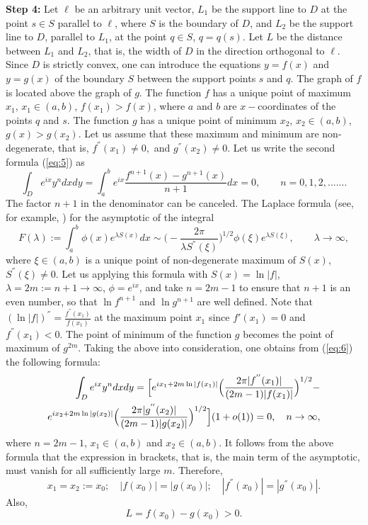 \documentclass[final,11pt]{article}
\begin{document}
{\bf Step 4:} Let $\ell$ be an arbitrary unit vector, $L_1$ be the support line to $D$ at the point $s\in S$
parallel to $\ell$, where $S$ is the boundary of $D$,
and $L_2$ be  the support line to $D$,  parallel to $L_1$, at the point $q\in S$, $q=q(s)$.
Let $L$ be the distance between $L_1$ and $L_2$, that is, the width
of $D$ in the direction orthogonal to $\ell$.
 Since $D$ is strictly convex, one can introduce the equations $y=f(x)$ and  $y=g(x)$
of the boundary $S$ between the support points $s$ and $q$. The graph of $f$ is located above
the graph of $g$. The function $f$ has a unique point of maximum $x_1$, $x_1\in (a,b)$, $f(x_1)>f(x)$,
where $a$ and $b$ are $x-$coordinates of the points  $q$ and $s$.
  The function $g$ has a unique point of  minimum $x_2$,  $x_2\in (a,b)$, $g(x)>g(x_2)$.
  Let us assume that these maximum and minimum are
non-degenerate, that is, $f^{''}(x_1)\neq 0,$ and $g^{''}(x_2)\neq 0.$
Let us write the second  formula (\ref{eq:5}) as
 \begin{equation}\label{eq:6}
\int_D e^{ix}y^ndxdy=\int_a^b e^{ix} \frac {f^{n+1}(x)-g^{n+1}(x)}{n+1} dx= 0, \qquad n=0,1,2,.......
\end{equation}
The factor $n+1$ in the denominator can be canceled. 
The Laplace formula (see, for example, \cite{F}) for the asymptotic of the integral
$$ F(\lambda):=\int_a^b \phi(x) e^{\lambda S(x)}dx\sim \Big(-\frac{2\pi}{\lambda S^{''}(\xi)}\Big)^{1/2} \phi(\xi)e^{\lambda S(\xi)},\qquad \lambda\to \infty,$$
where $\xi\in (a,b)$  is a unique point of non-degenerate maximum of $S(x)$,  $S^{''}(\xi)\neq 0$.
Let us applying this formula with $S(x)=\ln |f|$, $\lambda=2m:=n+1\to \infty$, $\phi=e^{ix}$,
and  take $n=2m-1$ to ensure that $n+1$ is an even number, so that
$\ln f^{n+1}$ and $\ln g^{n+1}$ are well defined. Note that $(\ln |f|)^{''}=
\frac {f^{''}(x_1)}{f(x_1)}$ at the maximum point $x_1$ since $f'(x_1)=0$ and $f^{''}(x_1)<0$.
The point of minimum of the function $g$ becomes the point of maximum of $g^{2m}$. 
Taking the above into consideration, one obtains from (\ref{eq:6}) the following formula:
\begin{eqnarray}
\int_D e^{ix}y^ndxdy=\Big[e^{ix_1+2m\ln |f(x_1)|}\Big(\frac{2\pi|f^{''}(x_1)|}{(2m-1)|f(x_1)|}\Big)^{1/2}- \notag\\
e^{ix_2+2m\ln |g(x_2)|}\Big(\frac{2\pi|g^{''}(x_2)|}{(2m-1)|g(x_2)|}\Big)^{1/2}\Big](1+o(1))= 0, \quad n\to \infty,
\end{eqnarray}
where $n=2m-1$, $x_1\in (a,b)$ and $x_2\in (a,b)$.
 It follows from the above formula  that the expression in brackets, that is, the main term of the asymptotic,
  must vanish for all sufficiently large $m$.
 Therefore,
 \begin{equation}\label{eq:8}
x_1=x_2:=x_0; \quad |f(x_0)|= |g(x_0)|; \quad |f^{''}(x_0)|=|g^{''}(x_0)|.
\end{equation}
Also,
 \begin{equation}\label{eq:9}
L=f(x_0)-g(x_0)>0.
\end{equation}
\end{document}
